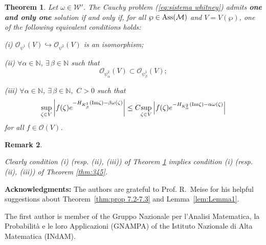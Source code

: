 \documentclass[twoside]{amsart}
\newtheorem{Th}{Theorem}[section]
\newtheorem{Rem}[Th]{Remark}
\begin{document}
\begin{Th}
  \label{thm:TEU2}
  Let $\omega\in{\mathcal{W}}'$.
The Cauchy problem (\ref{eq:sistema whitney}) admits
\textbf{one and only one }solution if and only if, for all $\wp\in{\mathop{\rm Ass}\nolimits}({\mathcal{M}})$
and $V=V(\wp)$, one of the following equivalent conditions holds:

(i) ${\mathcal O}_{\psi^{1}}(V)\hookrightarrow{\mathcal O}_{\psi^{2}}(V)$
is an isomorphism;

(ii) $\forall\alpha\in{\mathbb N}$, $\exists\,\beta\in{\mathbb N}$ such that 
\[
{\mathcal O}_{\psi_{\alpha}^{2}}(V)\subset{\mathcal O}_{\psi_{\beta}^{1}}(V);
\]

(iii) $\forall\alpha\in{\mathbb N}$, $\exists\,\beta\in{\mathbb N},\,\,C>0$ such that
\[
\underset{\zeta\in V}{\sup}\left|f(\zeta)e^{-H_{K_{\beta}^{1}}({\mathop{\rm Im}\nolimits}\zeta)
-\beta\omega(\zeta)}\right|\leq C\underset{\zeta\in V}{\sup}
\left|f(\zeta)e^{-H_{K_{\alpha}^{2}}({\mathop{\rm Im}\nolimits}\zeta)-\alpha\omega(\zeta)}\right|
\]
for all $f\in{\mathcal O}(V)$.
\end{Th}

\begin{Rem}
\begin{em}
Clearly condition \emph{(i) }(resp. \emph{(ii)}, \emph{(iii)}) of
Theorem \ref{thm:TEU2} implies condition \emph{(i)} (resp. \emph{(ii)},
\emph{(iii)}) of Theorem \ref{thm:345}.
\end{em}
\end{Rem}

{\bf Acknowledgments:}
The authors are grateful to Prof. R.~Meise for his helpful suggestions 
about Theorem~\ref{thm:prop 7.2-7.3} and Lemma~\ref{lem:Lemma1}.

The first author is member of the Gruppo Nazionale per l'Analisi Matematica,
la Probabilit\`a e le loro Applicazioni (GNAMPA) of the Istituto Nazionale
di Alta Matematica (INdAM).
\end{document}
